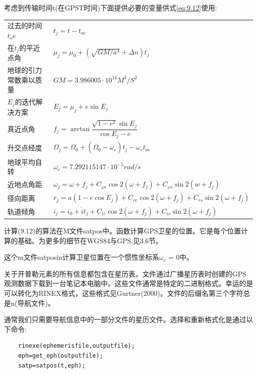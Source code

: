 	考虑到传输时间t(在GPST时间)下面提供必要的变量供式\ref{eq:9.12}使用:
	\begin{table}
		\begin{tabularx}{\textwidth}{XX}
			\hline 过去的时间 $t_oe$  & $t_j=t-t_{oe}$ \\ 
			在$t_j$的平近点角 & $\mu_j = \mu_0 + (\sqrt{GM/a^3}+\Delta n)t_j$ \\ 
			地球的引力常数乘以质量 & $GM=3.986005\cdot 10^{14}M^3/S^2$ \\ 
			$E_j$的迭代解决方案  & $E_j=\mu_j+e\sin E_j$ \\ 
			真近点角  & $f_j=\arctan \dfrac{\sqrt{1-e^2}\sin E_j}{\cos E_j-e}$ \\ 
			升交点经度  & $\Omega_j=\Omega_0 + (\dot{\Omega_0}-\omega_e)t_j-\omega_et_{oe}$ \\ 
			地球平均自转   & $\omega_e=7.292115147\cdot10^{-5}rad/s$ \\ 
			近地点角距  & $\omega_j=\omega+f_j+C_{\omega c}\cos2(\omega+f_j)+C_{\omega s}\sin2(w+f_j)$ \\ 
			径向距离  & $r_j = a(1-e\cos E_j)+C_{rc}\cos 2(\omega+f_j)+C_{rs}\sin 2(\omega+f_j)$ \\ 
			轨道倾角  & $i_j = i_0+\dot{i}t_j+C_{ic}\cos 2(\omega+f_j)+C_{is}\sin 2(\omega+f_j)$ \\ 
			\hline 
		\end{tabularx} 
	\end{table}
	
	计算(9.12)的算法在M文件satpos中。函数计算GPS卫星的位置。它是每个位置计算的基础。为更多的细节在WGS84与GPS,见3.6节。
	
	这个m文件satposin计算卫星位置在一个惯性坐标系$\omega_e$ = 0中。
	
	关于开普勒元素的所有信息都包含在星历表。文件通过广播星历表时创建的GPS观测数据下载到一台笔记本电脑中。这些文件通常是特定的二进制格式。幸运的是可以转化为RINEX格式，这些格式见Gurtner(2000)。文件的后缀名第三个字符总是n(导航文件)。
	
	通常我们只需要导航信息中的一部分文件的星历文件。选择和重新格式化是通过以下命令:
	\begin{lstlisting}
	rinexe(ephemerisfile,outputfile);
	eph=get_eph(outputfile);
	satp=satpos(t,eph);
	\end{lstlisting}	
